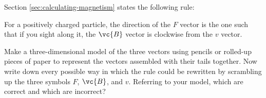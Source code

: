 Section \ref{sec:calculating-magnetism} states the following rule:

For a positively charged particle, the direction of the $F$
vector is the one such that if you sight along it, the $\vc{B}$
vector is clockwise from the $v$ vector.

Make a three-dimensional model of the three vectors using
pencils or rolled-up pieces of paper to represent the
vectors assembled with their tails together. Now write down
every possible way in which the rule could be rewritten by
scrambling up the three symbols $F$, $\vc{B}$, and $v$. Referring
to your model, which are correct and which are incorrect?
